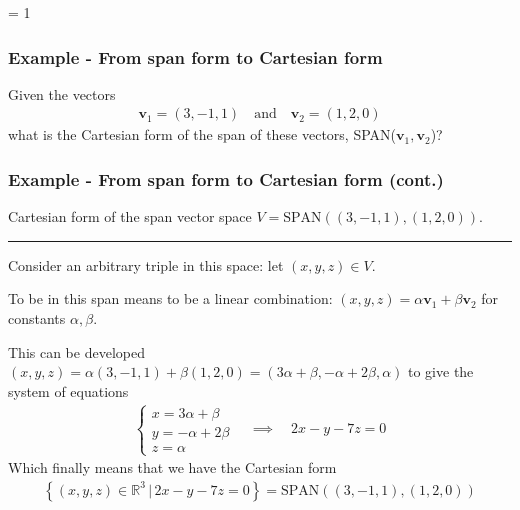 \documentclass[usenames,dvipsnames,aspectratio=169,10pt]{beamer}
\def \EXAMPLEVERSION {1} %
\numberwithin{equation}{section}
\begin{document}
\ifnum \EXAMPLEVERSION = 1

\begin{frame}
\frametitle{Example - From span form to Cartesian form}

Given the vectors
\begin{align*}
\textbf{v}_1 = (3,-1,1) \quad\text{and}\quad \textbf{v}_2 = (1,2,0)
\end{align*}
what is the Cartesian form of the span of these vectors, SPAN($\textbf{v}_1,\textbf{v}_2$)?

\end{frame}



\begin{frame}
\frametitle{Example - From span form to Cartesian form (cont.)}

Cartesian form of the span vector space $V=\text{SPAN}((3,-1,1),(1,2,0))$.

\vspace{-0.5cm}\begin{center} \textcolor{airforceblue}{\rule{0.7\textwidth}{0.3mm}} \end{center}\vspace{-0.2cm}

Consider an arbitrary triple in this space: let $(x,y,z) \in V$.

To be in this span means to be a linear combination: $(x,y,z) = \alpha\textbf{v}_1 + \beta\textbf{v}_2$ for constants $\alpha, \beta$.

This can be developed $(x,y,z) = \alpha(3,-1,1) + \beta(1,2,0) = (3\alpha + \beta,-\alpha + 2\beta,\alpha)$ to give the system of equations
\begin{align*}
\begin{cases}
x = 3\alpha + \beta \\
y = -\alpha + 2\beta \\
z = \alpha 
\end{cases}
\quad\implies\quad
2x - y - 7z = 0
\end{align*}
Which finally means that we have the Cartesian form
\begin{align*}
\left\{(x,y,z)\in\mathbb{R}^3 \, | \, 2x - y - 7z = 0\right\} = \text{SPAN}((3,-1,1),(1,2,0))
\end{align*}


\end{frame}
\end{document}

